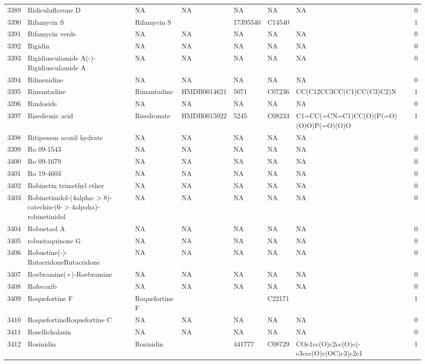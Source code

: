 \documentclass[a4paper]{article}
\begin{document}
\begin{longtable}{rlllllll}
  3389 & Ridiculuflavone D & NA & NA & NA & NA & NA & 0 \\ 
  3390 & Rifamycin S & Rifamycin S &  & 17395540 & C14540 &  & 1 \\ 
  3391 & Rifamycin verde & NA & NA & NA & NA & NA & 0 \\ 
  3392 & Rigidin & NA & NA & NA & NA & NA & 0 \\ 
  3393 & Rigidiusculamide A(-)-Rigidiusculamide A & NA & NA & NA & NA & NA & 0 \\ 
  3394 & Rilmenidine & NA & NA & NA & NA & NA & 0 \\ 
  3395 & Rimantadine & Rimantadine & HMDB0014621 & 5071 & C07236 & CC(C12CC3CC(C1)CC(C3)C2)N & 1 \\ 
  3396 & Rindoside & NA & NA & NA & NA & NA & 0 \\ 
  3397 & Risedronic acid & Risedronate & HMDB0015022 & 5245 & C08233 & C1=CC(=CN=C1)CC(O)(P(=O)(O)O)P(=O)(O)O & 1 \\ 
  3398 & Ritipenem acoxil hydrate & NA & NA & NA & NA & NA & 0 \\ 
  3399 & Ro 09-1543 & NA & NA & NA & NA & NA & 0 \\ 
  3400 & Ro 09-1679 & NA & NA & NA & NA & NA & 0 \\ 
  3401 & Ro 19-4603 & NA & NA & NA & NA & NA & 0 \\ 
  3402 & Robinetin trimethyl ether & NA & NA & NA & NA & NA & 0 \\ 
  3403 & Robinetinidol-(4alpha-$>$8)-catechin-(6-$>$4alpoha)-robinetinidol & NA & NA & NA & NA & NA & 0 \\ 
  3404 & Robustaol A & NA & NA & NA & NA & NA & 0 \\ 
  3405 & robustaquinone G & NA & NA & NA & NA & NA & 0 \\ 
  3406 & Robustine(-)-RutacridoneRutacridone & NA & NA & NA & NA & NA & 0 \\ 
  3407 & Roebramine(+)-Roebramine & NA & NA & NA & NA & NA & 0 \\ 
  3408 & Rofecoxib & NA & NA & NA & NA & NA & 0 \\ 
  3409 & Roquefortine F & Roquefortine F &  &  & C22171 &  & 1 \\ 
  3410 & RoquefortineRoquefortine C & NA & NA & NA & NA & NA & 0 \\ 
  3411 & Rosellichalasin & NA & NA & NA & NA & NA & 0 \\ 
  3412 & Rosinidin & Rosinidin &  & 441777 & C08729 & COc1cc(O)c2cc(O)c(-c3ccc(O)c(OC)c3)c2c1 & 1 \\ 

\end{longtable}
\end{document}
